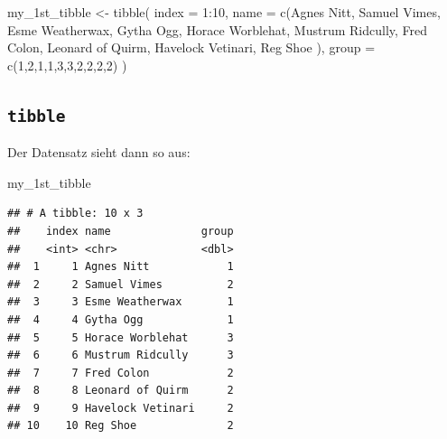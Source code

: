 \documentclass[
]{book}
\newenvironment{Shaded}{\begin{snugshade}}{\end{snugshade}}
\newcommand{\AttributeTok}[1]{\textcolor[rgb]{0.77,0.63,0.00}{#1}}
\newcommand{\DecValTok}[1]{\textcolor[rgb]{0.00,0.00,0.81}{#1}}
\newcommand{\FunctionTok}[1]{\textcolor[rgb]{0.00,0.00,0.00}{#1}}
\newcommand{\NormalTok}[1]{#1}
\newcommand{\OtherTok}[1]{\textcolor[rgb]{0.56,0.35,0.01}{#1}}
\newcommand{\SpecialCharTok}[1]{\textcolor[rgb]{0.00,0.00,0.00}{#1}}
\newcommand{\StringTok}[1]{\textcolor[rgb]{0.31,0.60,0.02}{#1}}
\begin{document}
\begin{Shaded}
\begin{Highlighting}[]
\NormalTok{my\_1st\_tibble }\OtherTok{\textless{}{-}} \FunctionTok{tibble}\NormalTok{(}
  \AttributeTok{index =} \DecValTok{1}\SpecialCharTok{:}\DecValTok{10}\NormalTok{,}
  \AttributeTok{name =} \FunctionTok{c}\NormalTok{(}\StringTok{\textquotesingle{}Agnes Nitt\textquotesingle{}}\NormalTok{,}
           \StringTok{\textquotesingle{}Samuel Vimes\textquotesingle{}}\NormalTok{,}
           \StringTok{\textquotesingle{}Esme Weatherwax\textquotesingle{}}\NormalTok{,}
           \StringTok{\textquotesingle{}Gytha Ogg\textquotesingle{}}\NormalTok{,}
           \StringTok{\textquotesingle{}Horace Worblehat\textquotesingle{}}\NormalTok{,}
           \StringTok{\textquotesingle{}Mustrum Ridcully\textquotesingle{}}\NormalTok{,}
           \StringTok{\textquotesingle{}Fred Colon\textquotesingle{}}\NormalTok{,}
           \StringTok{\textquotesingle{}Leonard of Quirm\textquotesingle{}}\NormalTok{,}
           \StringTok{\textquotesingle{}Havelock Vetinari\textquotesingle{}}\NormalTok{,}
           \StringTok{\textquotesingle{}Reg Shoe\textquotesingle{}}
\NormalTok{  ),}
  \AttributeTok{group =} \FunctionTok{c}\NormalTok{(}\DecValTok{1}\NormalTok{,}\DecValTok{2}\NormalTok{,}\DecValTok{1}\NormalTok{,}\DecValTok{1}\NormalTok{,}\DecValTok{3}\NormalTok{,}\DecValTok{3}\NormalTok{,}\DecValTok{2}\NormalTok{,}\DecValTok{2}\NormalTok{,}\DecValTok{2}\NormalTok{,}\DecValTok{2}\NormalTok{)}
\NormalTok{)}
\end{Highlighting}
\end{Shaded}

\hypertarget{tibble}{%
\subsection{\texorpdfstring{\texttt{tibble}}{tibble}}\label{tibble}}

Der Datensatz sieht dann so aus:

\begin{Shaded}
\begin{Highlighting}[]
\NormalTok{my\_1st\_tibble}
\end{Highlighting}
\end{Shaded}

\begin{verbatim}
## # A tibble: 10 x 3
##    index name              group
##    <int> <chr>             <dbl>
##  1     1 Agnes Nitt            1
##  2     2 Samuel Vimes          2
##  3     3 Esme Weatherwax       1
##  4     4 Gytha Ogg             1
##  5     5 Horace Worblehat      3
##  6     6 Mustrum Ridcully      3
##  7     7 Fred Colon            2
##  8     8 Leonard of Quirm      2
##  9     9 Havelock Vetinari     2
## 10    10 Reg Shoe              2
\end{verbatim}
\end{document}
